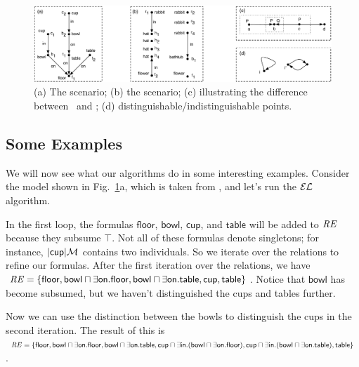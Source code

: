 \begin{figure}
  \centering
  \includegraphics[width=\textwidth]{pic-dale-haddock}
  \caption{(a) The 
    scenario; (b) the  scenario; (c) illustrating
    the difference between \el\ and \alc; (d)
    distinguishable/indistinguishable points.}
  \label{fig:dale-haddock}
\end{figure}


\subsection{Some Examples}\label{sec:examples}

We will now see what our algorithms do in some interesting
examples. Consider the model shown in
Fig.~\ref{fig:dale-haddock}a, which is taken from
, and
let's run the $\mathcal{EL}$ algorithm.

In the first loop,
the formulas $\mathsf{floor}$, $\mathsf{bowl}$,
$\mathsf{cup}$, and $\mathsf{table}$ will be added to $\mathit{RE}$ because they subsume $\top$.  Not all of these formulas denote singletons; for instance,
$|\mathsf{cup}|\mathcal{M}$ contains two individuals.  So we iterate over
the relations to refine our formulas.  After the first
iteration over the relations, we have $\mathit{RE} = \{ \mathsf{floor},
\mathsf{bowl} \sqcap \exists \mathsf{on}.\mathsf{floor}, \mathsf{bowl}
\sqcap \exists \mathsf{on}.\mathsf{table}, \mathsf{cup},
\mathsf{table} \}$. Notice that $\mathsf{bowl}$ has become subsumed,
but we haven't distinguished the cups and tables further.

Now we can
use the distinction between the bowls to distinguish the cups in the
second iteration.  The result of this is $\mathit{RE} = \{ \mathsf{floor},
\mathsf{bowl} \sqcap \exists \mathsf{on}.\mathsf{floor}, \mathsf{bowl}
\sqcap \exists \mathsf{on}.\mathsf{table}, \mathsf{cup} \sqcap \exists
\mathsf{in}. (\mathsf{bowl} \sqcap \exists
\mathsf{on}.\mathsf{floor}), \mathsf{cup} \sqcap \exists
\mathsf{in}. (\mathsf{bowl} \sqcap \exists
\mathsf{on}.\mathsf{table}), \mathsf{table} \}$.

